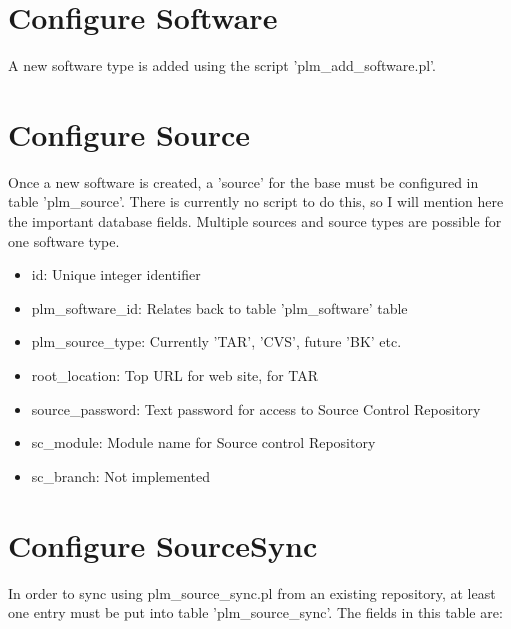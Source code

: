 \section {Configure Software}
A new software type is added using the script 'plm\_add\_software.pl'.

\section {Configure Source}
Once a new software is created, a 'source' for the base must be configured in table 'plm\_source'.  There is currently no script to do this, so I will mention here the important database fields.  Multiple sources and source types are possible for one software type.

\begin{itemize}
\item id: Unique integer identifier
\item plm\_software\_id: Relates back to table 'plm\_software' table
\item plm\_source\_type: Currently 'TAR', 'CVS', future 'BK' etc.
\item root\_location: Top URL for web site, for TAR
\item source\_password: Text password for access to Source Control Repository
\item sc\_module: Module name for Source control Repository
\item sc\_branch: Not implemented
\end{itemize}

\section {Configure SourceSync}
In order to sync using plm\_source\_sync.pl from an existing repository, at least one entry must be put into table 'plm\_source\_sync'.  The fields in this table are:

